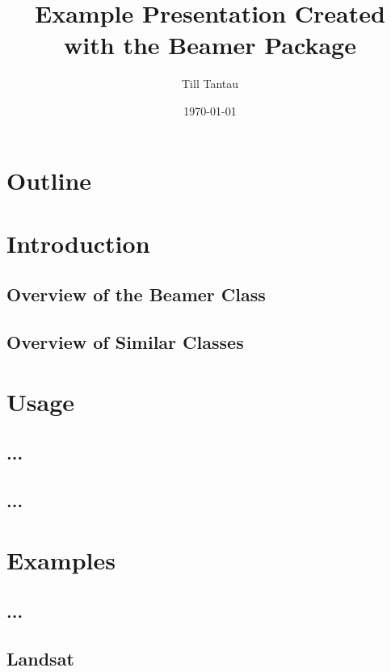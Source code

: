 \documentclass{beamer}
\title{Example Presentation Created with the Beamer Package}
\author{Till Tantau}
\date{\today}
\begin{document}
\begin{frame}
           \titlepage
\end{frame}

\section*{Outline}
        \begin{frame}
           \tableofcontents
         \end{frame}

\section{Introduction}
         \subsection{Overview of the Beamer Class}
         \subsection{Overview of Similar Classes}

\section{Usage} \subsection{...} \subsection{...}

\section{Examples} \subsection{...}

\subsection{Landsat}
         \begin{frame}
         \end{frame} %
\end{document}
